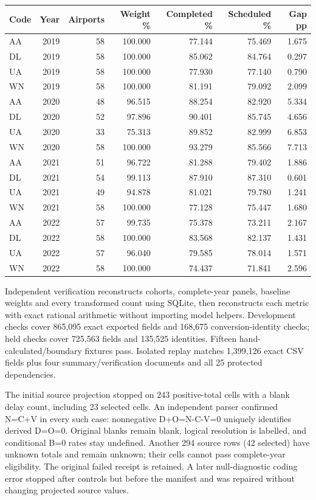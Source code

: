 \documentclass[11pt]{article}
\begin{document}
\begin{center}\small\setlength{\tabcolsep}{4pt}
\begin{tabular}{lrrrrrr}\toprule
Code & Year & Airports & Weight \% & Completed \% & Scheduled \% & Gap pp \\
\midrule
AA & 2019 & 58 & 100.000 & 77.144 & 75.469 & 1.675 \\
DL & 2019 & 58 & 100.000 & 85.062 & 84.764 & 0.297 \\
UA & 2019 & 58 & 100.000 & 77.930 & 77.140 & 0.790 \\
WN & 2019 & 58 & 100.000 & 81.191 & 79.092 & 2.099 \\
AA & 2020 & 48 & 96.515 & 88.254 & 82.920 & 5.334 \\
DL & 2020 & 52 & 97.896 & 90.401 & 85.745 & 4.656 \\
UA & 2020 & 33 & 75.313 & 89.852 & 82.999 & 6.853 \\
WN & 2020 & 58 & 100.000 & 93.279 & 85.566 & 7.713 \\
AA & 2021 & 51 & 96.722 & 81.288 & 79.402 & 1.886 \\
DL & 2021 & 54 & 99.113 & 87.910 & 87.310 & 0.601 \\
UA & 2021 & 49 & 94.878 & 81.021 & 79.780 & 1.241 \\
WN & 2021 & 58 & 100.000 & 77.128 & 75.447 & 1.680 \\
AA & 2022 & 57 & 99.735 & 75.378 & 73.211 & 2.167 \\
DL & 2022 & 58 & 100.000 & 83.568 & 82.137 & 1.431 \\
UA & 2022 & 57 & 96.040 & 79.585 & 78.014 & 1.571 \\
WN & 2022 & 58 & 100.000 & 74.437 & 71.841 & 2.596 \\
\bottomrule\end{tabular}\end{center}
Independent verification reconstructs cohorts, complete-year panels, baseline weights and every transformed count using SQLite, then reconstructs each metric with exact rational arithmetic without importing model helpers. Development checks cover 865,095 exact exported fields and 168,675 conversion-identity checks; held checks cover 725,563 fields and 135,525 identities. Fifteen hand-calculated/boundary fixtures pass. Isolated replay matches 1,399,126 exact CSV fields plus four summary/verification documents and all 25 protected dependencies.

The initial source projection stopped on 243 positive-total cells with a blank delay count, including 23 selected cells. An independent parser confirmed N=C+V in every such case: nonnegative D+O=N-C-V=0 uniquely identifies derived D=O=0. Original blanks remain blank, logical resolution is labelled, and conditional B=0 rates stay undefined. Another 294 source rows (42 selected) have unknown totals and remain unknown; their cells cannot pass complete-year eligibility. The original failed receipt is retained. A later null-diagnostic coding error stopped after controls but before the manifest and was repaired without changing projected source values.
\end{document}
